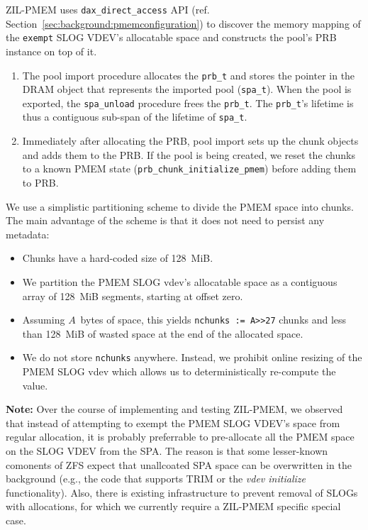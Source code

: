 \documentclass[12pt,a4paper,twoside]{book}
\begin{document}
ZIL-PMEM uses \lstinline{dax_direct_access} API (ref. Section~\ref{sec:background:pmemconfiguration}) to discover the memory mapping of the \lstinline{exempt} SLOG VDEV's allocatable space and constructs the pool's PRB instance on top of it.
\begin{enumerate}
\item The pool import procedure allocates the \lstinline{prb_t} and stores the pointer in the DRAM object that represents the imported pool (\lstinline{spa_t}).
When the pool is exported, the \lstinline{spa_unload} procedure frees the \lstinline{prb_t}.
The \lstinline{prb_t}'s lifetime is thus a contiguous sub-span of the lifetime of \lstinline{spa_t}.
\item  Immediately after allocating the PRB, pool import sets up the chunk objects and adds them to the PRB.
If the pool is being created, we reset the chunks to a known PMEM state (\lstinline{prb_chunk_initialize_pmem}) before adding them to PRB.
\end{enumerate}

We use a simplistic partitioning scheme to divide the PMEM space into chunks.
The main advantage of the scheme is that it does not need to persist any metadata:
\begin{itemize}[noitemsep]
    \item Chunks have a hard-coded size of 128~MiB.
    \item We partition the PMEM SLOG vdev's allocatable space as a contiguous array of 128~MiB segments, starting at offset zero.
    \item Assuming $A$~bytes of space, this yields \lstinline{nchunks := A>>27} chunks and less than 128~MiB of wasted space at the end of the allocated space.
    \item We do not store \lstinline{nchunks} anywhere. Instead, we prohibit online resizing of the PMEM SLOG vdev which allows us to deterministically re-compute the value.
\end{itemize}

\textbf{Note:} Over the course of implementing and testing ZIL-PMEM, we observed that instead of attempting to exempt the PMEM SLOG VDEV's space from regular allocation, it is probably preferrable to pre-allocate all the PMEM space on the SLOG VDEV from the SPA.
The reason is that some lesser-known comonents of ZFS expect that unallcoated SPA space can be overwritten in the background (e.g., the code that supports TRIM or the \textit{vdev initialize} functionality).
Also, there is existing infrastructure to prevent removal of SLOGs with allocations, for which we currently require a ZIL-PMEM specific special case.
\end{document}
